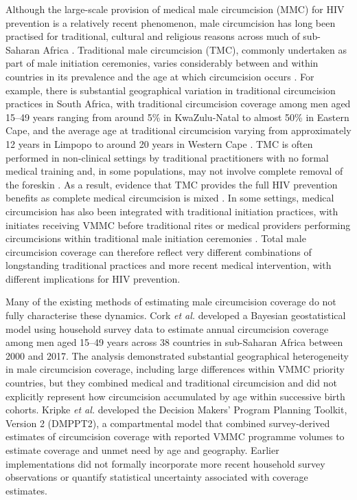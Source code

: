 \documentclass{article}
\begin{document}
\noindent Although the large-scale provision of medical male circumcision (MMC) for HIV prevention is a relatively recent phenomenon, male circumcision has long been practised for traditional, cultural and religious reasons across much of sub-Saharan Africa \cite{WHOGlobalMC, lawal2017circumcision}. Traditional male circumcision (TMC), commonly undertaken as part of male initiation ceremonies, varies considerably between and within countries in its prevalence and the age at which circumcision occurs \cite{wilcken2010traditional}. For example, there is substantial geographical variation in traditional circumcision practices in South Africa, with traditional circumcision coverage among men aged 15–49 years ranging from around 5\% in KwaZulu-Natal to almost 50\% in Eastern Cape, and the average age at traditional circumcision varying from approximately 12 years in Limpopo to around 20 years in Western Cape \cite{thomas2024substantial}. TMC is often performed in non-clinical settings by traditional practitioners with no formal medical training and, in some populations, may not involve complete removal of the foreskin \cite{wilcken2010traditional, WHOTraditional, bailey2008male}. As a result, evidence that TMC provides the full HIV prevention benefits as complete medical circumcision is mixed \cite{shaffer2007protective, maffioli2017traditional, asa2023traditional}. In some settings, medical circumcision has also been integrated with traditional initiation practices, with initiates receiving VMMC before traditional rites or medical providers performing circumcisions within traditional male initiation ceremonies \cite{bulled2016making, thomas2024substantial}. Total male circumcision coverage can therefore reflect very different combinations of longstanding traditional practices and more recent medical intervention, with different implications for HIV prevention.

\noindent Many of the existing methods of estimating male circumcision coverage do not fully characterise these dynamics. Cork {\it et al.} \cite{cork2020mapping} developed a Bayesian geostatistical model using household survey data to estimate annual circumcision coverage among men aged 15–49 years across 38 countries in sub-Saharan Africa between 2000 and 2017. The analysis demonstrated substantial geographical heterogeneity in male circumcision coverage, including large differences within VMMC priority countries, but they combined medical and traditional circumcision and did not explicitly represent how circumcision accumulated by age within successive birth cohorts. Kripke {\it et al.} \cite{kripke2016age, kripke2016cost} developed the Decision Makers’ Program Planning Toolkit, Version 2 (DMPPT2), a compartmental model that combined survey-derived estimates of circumcision coverage with reported VMMC programme volumes to estimate coverage and unmet need by age and geography. Earlier implementations did not formally incorporate more recent household survey observations or quantify statistical uncertainty associated with coverage estimates. 
\end{document}

